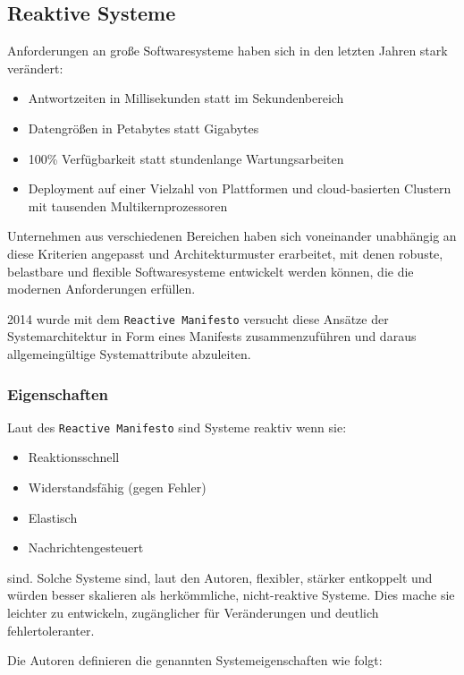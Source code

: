 \subsection{Reaktive Systeme}
\label{subsection:reaktive_systeme}
Anforderungen an große Softwaresysteme haben sich in den letzten Jahren stark verändert:
\begin{itemize}
    \item Antwortzeiten in Millisekunden statt im Sekundenbereich
    \item Datengrößen in Petabytes statt Gigabytes
    \item 100\% Verfügbarkeit statt stundenlange Wartungsarbeiten
    \item Deployment auf einer Vielzahl von Plattformen und cloud-basierten Clustern mit tausenden Multikernprozessoren
\end{itemize}

Unternehmen aus verschiedenen Bereichen haben sich voneinander unabhängig an diese Kriterien angepasst und Architekturmuster
erarbeitet, mit denen robuste, belastbare und flexible Softwaresysteme entwickelt werden können, die die modernen Anforderungen
erfüllen.

2014 wurde mit dem \verb|Reactive Manifesto| versucht diese Ansätze der Systemarchitektur in Form eines Manifests zusammenzuführen
und daraus allgemeingültige Systemattribute abzuleiten.

\subsubsection{Eigenschaften}
\label{subsubsec:reaktive_systeme_eigenschaften}
Laut des \verb|Reactive Manifesto| sind Systeme reaktiv wenn sie:
\begin{itemize}
    \item Reaktionsschnell
    \item Widerstandsfähig (gegen Fehler)
    \item Elastisch
    \item Nachrichtengesteuert
\end{itemize}
sind.
Solche Systeme sind, laut den Autoren, flexibler, stärker entkoppelt und würden besser skalieren als herkömmliche, nicht-reaktive Systeme.
Dies mache sie leichter zu entwickeln, zugänglicher für Veränderungen und deutlich fehlertoleranter.

Die Autoren definieren die genannten Systemeigenschaften wie folgt:

